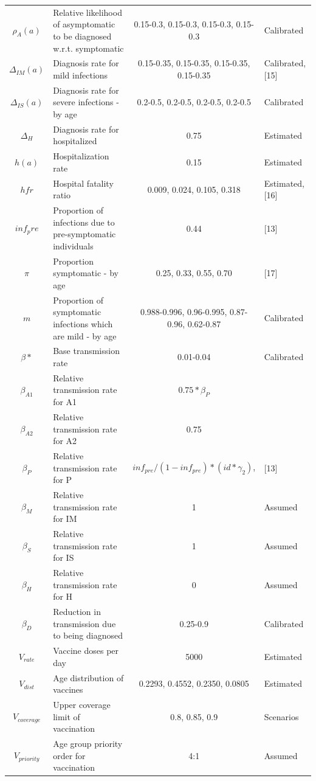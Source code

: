 \documentclass[11pt]{article}
\begin{document}
\begin{table}
\begin{tabular}{c l c l}
$\rho_A(a)$ & Relative likelihood of asymptomatic to be diagnosed w.r.t. symptomatic & 0.15-0.3, 0.15-0.3, 0.15-0.3, 0.15-0.3 & Calibrated   \\
$ \Delta_{IM}(a)$ & Diagnosis rate for mild infections   &  0.15-0.35, 0.15-0.35, 0.15-0.35, 0.15-0.35 & Calibrated, [15]  \\
$ \Delta_{IS}(a)$ & Diagnosis rate for severe infections - by age  & 0.2-0.5, 0.2-0.5, 0.2-0.5, 0.2-0.5 & Calibrated \\
$ \Delta_{H}$ & Diagnosis rate for hospitalized   &   0.75 & Estimated   \\
$h(a)$ & Hospitalization rate  &  0.15 & Estimated \\
$hfr$ & Hospital fatality ratio & 0.009, 0.024, 0.105, 0.318 & Estimated, [16]\\
$inf_pre   $ & Proportion of infections due to pre-symptomatic individuals & 0.44 & [13]\\
$\pi$ & Proportion symptomatic - by age  & 0.25, 0.33, 0.55, 0.70  &  [17]  \\
$m$ & Proportion of symptomatic infections which are mild - by age & 0.988-0.996, 0.96-0.995, 0.87-0.96, 0.62-0.87 & Calibrated \\
$\beta*$ & Base transmission rate  &   0.01-0.04 & Calibrated  \\
$\beta_{A1}$ & Relative transmission rate for A1 &  $0.75 * \beta_P$ & \\
$\beta_{A2}$ & Relative transmission rate for A2  &  0.75 &    \\
$\beta_P$ & Relative transmission rate for P  &  $inf_{pre} / (1 - inf_{pre}) * (id * \gamma_2)$,  & [13] \\
$\beta_M$ & Relative transmission rate for IM  & 1& Assumed  \\
$\beta_S$ & Relative transmission rate for IS  & 1& Assumed \\
$\beta_H$ & Relative transmission rate for H  &  0 & Assumed\\
$\beta_D$ & Reduction in transmission due to being diagnosed  &  0.25-0.9 & Calibrated   \\
$V_{rate}$ & Vaccine doses per day  &   5000 &   Estimated \\
$V_{dist}$ & Age distribution of vaccines  &   0.2293, 0.4552, 0.2350, 0.0805 & Estimated \\
$V_{coverage}$ & Upper coverage limit of vaccination  & 0.8, 0.85, 0.9 & Scenarios   \\
$V_{priority}$ & Age group priority order for vaccination  &  4:1 & Assumed \\
\end{tabular}
\end{table}
\newpage
\end{document}
